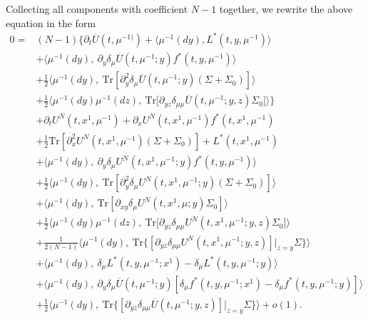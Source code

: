 \documentclass{amsart}
\theoremstyle{definition}
\theoremstyle{remark}
\numberwithin{equation}{section}
\begin{document}
Collecting all components with coefficient $N-1$ together, we rewrite the above equation in the form
{\allowdisplaybreaks
\begin{align*}
0= &  (N-1)\Big\{ \partial_t \overline U (t, \mu^{-1)})  + \langle \mu^{-1} (dy) , L^*(t,y, \mu^{-1})  \rangle  \\
&+
\langle \mu^{-1}(dy), \ \partial_y\delta_\mu \overline U(t, \mu^{-1}; y) f^*(t, y, \mu^{-1})\rangle \\
& +\frac12\langle\mu^{-1}(dy),\   \mbox{Tr}[\partial_{y}^2\delta_\mu \overline U(t, \mu^{-1}; y)(\Sigma+\Sigma_0) ]  \rangle \\
&+ \frac12 \langle\mu^{-1}(dy) \mu^{-1}(dz), \    \mbox{Tr[}\partial_{yz} \delta_{\mu\mu}\overline U(t, \mu^{-1};y,z) \Sigma_0  ]\rangle
\Big\} \\
&+ \partial_t U^N(t, x^1, \mu^{-1})  + \partial_x U^N(t,x^1, \mu^{-1})f^*(t, x^1, \mu^{-1})  \\
& + \frac12 \mbox{Tr}[ \partial_x^2 U^N(t, x^1, \mu^{-1}) (\Sigma+\Sigma_0)] + L^*(t,x^1, \mu^{-1}) \\
&+  \langle  \mu^{-1}(dy), \  \partial_y \delta_\mu U^N(t, x^1, \mu^{-1}; y)
f^*(t,y, \mu^{-1})    \rangle\\
&  +\frac12  \langle\mu^{-1}(dy) ,\    \mbox{Tr} [\partial_y^2 \delta_\mu U^N(t, x^1, \mu^{-1}; y) (\Sigma+\Sigma_0)]  \rangle\\
&+\langle \mu^{-1}(dy),\ \mbox{Tr} [\partial_{xy}\delta_\mu U^N(t,x^1, \mu; y)\Sigma_0 ]\rangle \\
& + \frac12\langle\mu^{-1}(dy) \mu^{-1}(dz), \    \mbox{Tr[}\partial_{yz} \delta_{\mu\mu} U^N(t, x^1, \mu^{-1};y,z) \Sigma_0  ]\rangle \\
&  +  \frac{1}{2(N-1)}\langle\mu^{-1}(dy) , \    \mbox{Tr}\{[\partial_{yz} \delta_{\mu\mu} U^N(t, x^1, \mu^{-1};y,z)]|_{z=y} \Sigma \} \rangle\\
 &+\langle\mu^{-1}(dy), \    \delta_\mu L^*( t, y, \mu^{-1};x^1)  -  \delta_\mu L^*( t, y, \mu^{-1};y)    \rangle \\
&+ \langle \mu^{-1}(dy),\   \partial_y\delta_\mu \overline U(t, \mu^{-1}; y)[  \delta_\mu f^*(t, y, \mu^{-1}; x^1)- \delta_\mu f^*(t, y, \mu^{-1}; y) ]  \rangle \\
& +  \frac12\langle\mu^{-1}(dy) , \    \mbox{Tr}\{[\partial_{yz} \delta_{\mu\mu} \overline U(t, \mu^{-1};y,z)]|_{z=y} \Sigma \} \rangle +o(1) .
\end{align*}
}
\end{document}

